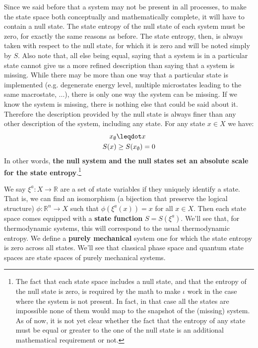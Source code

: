 \documentclass[letterpaper]{article}
\begin{document}
Since we said before that a system may not be present in all processes, to make the state space both conceptually and mathematically complete, it will have to contain a null state. The state entropy of the null state of each system must be zero, for exactly the same reasons as before. The state entropy, then, is always taken with respect to the null state, for which it is zero and will be noted simply by $S$. Also note that, all else being equal, saying that a system is in a particular state cannot give us a more refined description than saying that a system is missing. While there may be more than one way that a particular state is implemented (e.g. degenerate energy level, multiple microstates leading to the same macrostate, ...), there is only one way the system can be missing. If we know the system is missing, there is nothing else that could be said about it. Therefore the description provided by the null state is always finer than any other description of the system, including any state. For any state $x \in X$ we have:
\begin{equation}\label{entropy_lower_bound}
\begin{aligned}
x_\emptyset &\finer x \\
S(x) &\geq S(x_\emptyset) = 0
\end{aligned}
\end{equation}
In other words, \textbf{the null system and the null states set an absolute scale for the state entropy}.\footnote{The fact that each state space includes a null state, and that the entropy of the null state is zero, is required by the math to make $\iota$ work in the case where the system is not present. In fact, in that case all the states are impossible none of them would map to the snapshot of the (missing) system. As of now, it is not yet clear whether the fact that the entropy of any state must be equal or greater to the one of the null state is an additional mathematical requirement or not.}

We say $\xi^a : X \to \mathbb{R}$ are a set of state variables if they uniquely identify a state. That is, we can find an isomorphism (a bijection that preserve the logical structure) $\phi : \mathbb{R}^n \to X$ such that $\phi(\xi^a(x)) = x$ for all $x \in X$. Then each state space comes equipped with a \textbf{state function} $S=S(\xi^a)$. We'll see that, for thermodynamic systems, this will correspond to the usual thermodynamic entropy. We define a \textbf{purely mechanical} system one for which the state entropy is zero across all states. We'll see that classical phase space and quantum state spaces are state spaces of purely mechanical systems.
\end{document}
